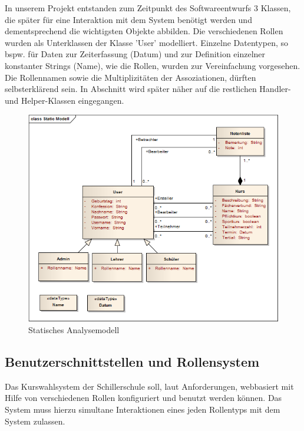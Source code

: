 In unserem Projekt entstanden zum Zeitpunkt des Softwareentwurfs 3 Klassen, die später für eine Interaktion mit dem System benötigt werden und dementsprechend die wichtigsten Objekte abbilden. Die verschiedenen Rollen wurden als Unterklassen der Klasse 'User' modelliert. Einzelne Datentypen, so bspw. für Daten zur Zeiterfassung (Datum) und zur Definition einzelner konstanter Strings (Name), wie die Rollen, wurden zur Vereinfachung vorgesehen.
Die Rollennamen sowie die Multiplizitäten der Assoziationen, dürften selbsterklärend sein.
In Abschnitt  wird später näher auf die restlichen Handler- und Helper-Klassen eingegangen.

\begin{figure}[H]
 \begin{center}
   \includegraphics[scale=0.7]{img/StaticClassModel_kuwasys20.png}
 \end{center}
 \caption[\textbf{Statisches Analysemodell}]{Statisches Analysemodell}
 \label{fig:UML_SA_kuwasys20}
\end{figure}

\subsection{Benutzerschnittstellen und Rollensystem}\label{subsec:Benutzerschnittstellen und Rollensystem}

Das Kurswahlsystem der Schillerschule soll, laut Anforderungen, webbasiert mit Hilfe von verschiedenen Rollen konfiguriert und benutzt werden können.
Das System muss hierzu simultane Interaktionen eines jeden Rollentyps mit dem System zulassen. 

